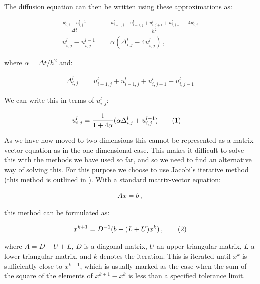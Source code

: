 \documentclass[reprint,english,notitlepage]{revtex4-1}  %
\newcommand\numberthis{\addtocounter{equation}{1}\tag{\theequation}}
\begin{document}
The diffusion equation can then be written using these approximations as:

\begin{align*}
\frac{u_{i,j}^l - u_{i,j}^{l-1} }{\Delta t}  &= \frac{u_{i+1,j}^l + u_{i-1,j}^l + u_{i,j+1}^l + u_{i,j-1}^l - 4u_{i,j}^l}{h^2} \\
u_{i,j}^l - u_{i,j}^{l-1} &= \alpha(\Delta_{i,j}^l - 4u_{i,j}^l) \, , 
\end{align*}

where $\alpha = \Delta t /h^2$ and:

\begin{align*}
\Delta_{i,j}^l &= u_{i+1,j}^l + u_{i-1,j}^l + u_{i,j+1}^l + u_{i,j-1}^l
\end{align*}

We can write this in terms of $u_{i,j}^l$:

\begin{align*}
u_{i,j}^l &= \frac{1}{1 + 4\alpha} (\alpha \Delta_{i,j}^l + u_{i,j}^{l-1} ) \numberthis \label{eq:2D_diff_eq_numerical_solution}
\end{align*}

As we have now moved to two dimensions this cannot be represented as a matrix-vector equation as in the one-dimensional case. This makes it difficult to solve this with the methods we have used so far, and so we need to find an alternative way of solving this. For this purpose we choose to use Jacobi's iterative method (this method is outlined in \cite[p~.189-190]{Hjorth-Jensen2015}). With a standard matrix-vector equation:

\begin{align*}
Ax = b \, ,
\end{align*}

this method can be formulated as:

\begin{align*}
x^{k+1} = D^{-1}(b - (L+U)x^k) \, , \numberthis \label{eq:jacobi_iterative_method}
\end{align*}

where $A = D + U + L$, $D$ is a diagonal matrix, $U$ an upper triangular matrix, $L$ a lower triangular matrix, and $k$ denotes the iteration. This is iterated until $x^k$ is sufficiently close to $x^{k+1}$, which is usually marked as the case when the sum of the square of the elements of $x^{k+1} - x^k$ is less than a specified tolerance limit. 

\end{document}
